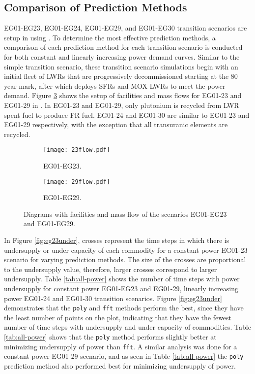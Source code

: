 \subsection{Comparison of Prediction Methods}

EG01-EG23, EG01-EG24, EG01-EG29, and EG01-EG30 transition scenarios
are setup in \Cyclus using \deploy. 
To determine the most effective \deploy prediction methods, a
comparison of each prediction method for each 
transition scenario is conducted for both constant and 
linearly increasing power demand curves.
Similar to the simple transition scenario, these transition scenario 
simulations begin with an initial fleet of \glspl{LWR} 
that are progressively decommissioned starting at the 80 year mark, 
after which \deploy deploys \glspl{SFR} and \gls{MOX} \glspl{LWR} to meet 
the power demand. 
Figure \ref{fig:eg2329}
shows the setup of facilities and mass flows for 
EG01-23 and EG01-29 in \Cyclus. 
In EG01-23 and EG01-29, only plutonium is recycled from \gls{LWR}
spent fuel to produce \gls{FR} fuel. 
EG01-24 and EG01-30 are similar to EG01-23 and EG01-29 respectively,
with the exception that all transuranic elements are recycled.  

\begin{figure}[]
	\centering
	\begin{subfigure}[t]{\textwidth}
		\centering
		\texttt{[image: 23flow.pdf]} 
		\caption{EG01-EG23.}
		\label{fig:23flow}
	\end{subfigure}
	\vspace{1cm}
	\begin{subfigure}[t]{\textwidth}
		\centering
		\texttt{[image: 29flow.pdf]} 
		\caption{EG01-EG29.}
		\label{fig:29flow}
	\end{subfigure}
	\hfill
	\caption{Diagrams with facilities and mass flow of the scenarios EG01-EG23 and EG01-EG29.}
	\label{fig:eg2329}
\end{figure}

In Figure \ref{fig:eg23under}, crosses represent the time steps in which there is 
undersupply or under capacity of each commodity for a constant power 
EG01-23 scenario for varying prediction methods.
The size of the crosses are proportional to the undersupply
value, therefore, larger crosses correspond to larger undersupply. 
Table \ref{tab:all-power} shows the number of time steps with power 
undersupply for constant power EG01-EG23 and EG01-29, 
linearly increasing power EG01-24 and EG01-30 transition scenarios. 
Figure \ref{fig:eg23under} demonstrates that the \texttt{poly} and 
\texttt{fft} methods perform the best, since they have the least number 
of points on the plot, indicating that they have the fewest number of time 
steps with undersupply and under capacity of commodities. 
Table \ref{tab:all-power} shows that the \texttt{poly} method performs slightly 
better at minimizing undersupply of power than \texttt{fft}.
A similar analysis was done for a constant power EG01-29 scenario, and as seen 
in Table \ref{tab:all-power}
the \texttt{poly} prediction method also performed best for minimizing undersupply 
of power.  


